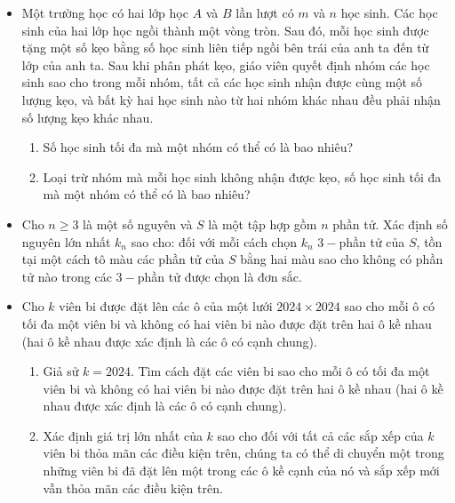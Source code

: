 \documentclass[11pt]{scrartcl}
\begin{document}
\begin{itemize}[label=, leftmargin=0em, itemsep=0.5em]
    \item \begin{btvn}
    Một trường học có hai lớp học $A$ và $B$ lần lượt có $m$ và $n$ học sinh. Các học sinh của hai lớp học ngồi thành một vòng tròn. Sau đó, mỗi học sinh được tặng một số kẹo bằng số học sinh liên tiếp ngồi bên trái của anh ta đến từ lớp của anh ta. Sau khi phân phát kẹo, giáo viên quyết định nhóm các học sinh sao cho trong mỗi nhóm, tất cả các học sinh nhận được cùng một số lượng kẹo, và bất kỳ hai học sinh nào từ hai nhóm khác nhau đều phải nhận số lượng kẹo khác nhau.
    \begin{enumerate}[label=(\alph*)]
        \item Số học sinh tối đa mà một nhóm có thể có là bao nhiêu?
        \item Loại trừ nhóm mà mỗi học sinh không nhận được kẹo, số học sinh tối đa mà một nhóm có thể có là bao nhiêu?
    \end{enumerate}
    \end{btvn}

    \item \begin{btvn} Cho $n \geq 3$ là một số nguyên và $S$ là một tập hợp gồm $n$ phần tử. Xác định số nguyên lớn nhất $k_n$ sao cho: đối với mỗi cách chọn $k_n$ $3-$phần tử của $S$, tồn tại một cách tô màu các phần tử của $S$ bằng hai màu sao cho không có phần tử nào trong các $3-$phần tử được chọn là đơn sắc.
    \end{btvn}

    \item\begin{btvn}
    Cho $k$ viên bi được đặt lên các ô của một lưới $2024 \times 2024$ sao cho mỗi ô có tối đa một viên bi và không có hai viên bi nào được đặt trên hai ô kề nhau (hai ô kề nhau được xác định là các ô có cạnh chung).
    \begin{enumerate}[label=(\alph*)]
        \item Giả sử $k=2024$. Tìm cách đặt các viên bi sao cho mỗi ô có tối đa một viên bi và không có hai viên bi nào được đặt trên hai ô kề nhau (hai ô kề nhau được xác định là các ô có cạnh chung).
        \item Xác định giá trị lớn nhất của $k$ sao cho đối với tất cả các sắp xếp của $k$ viên bi thỏa mãn các điều kiện trên, chúng ta có thể di chuyển một trong những viên bi đã đặt lên một trong các ô kề cạnh của nó và sắp xếp mới vẫn thỏa mãn các điều kiện trên.
    \end{enumerate}
    \end{btvn}


\end{itemize}
\end{document}
